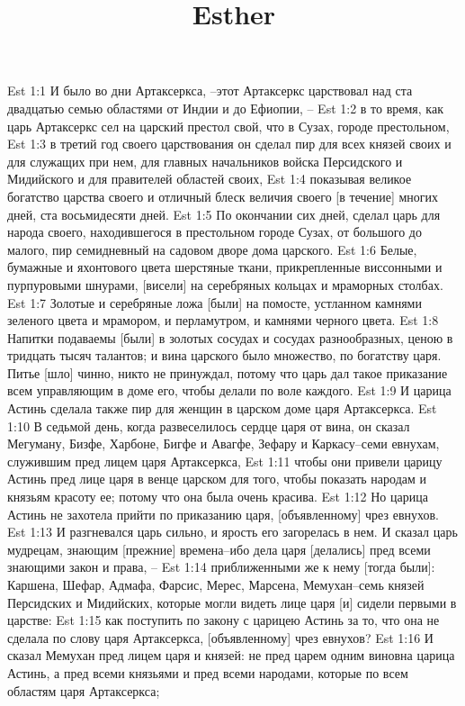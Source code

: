 

\title{Esther}

Est 1:1  И было во дни Артаксеркса, --этот Артаксеркс царствовал над ста двадцатью семью областями от Индии и до Ефиопии, --
Est 1:2  в то время, как царь Артаксеркс сел на царский престол свой, что в Сузах, городе престольном,
Est 1:3  в третий год своего царствования он сделал пир для всех князей своих и для служащих при нем, для главных начальников войска Персидского и Мидийского и для правителей областей своих,
Est 1:4  показывая великое богатство царства своего и отличный блеск величия своего [в течение] многих дней, ста восьмидесяти дней.
Est 1:5  По окончании сих дней, сделал царь для народа своего, находившегося в престольном городе Сузах, от большого до малого, пир семидневный на садовом дворе дома царского.
Est 1:6  Белые, бумажные и яхонтового цвета шерстяные ткани, прикрепленные виссонными и пурпуровыми шнурами, [висели] на серебряных кольцах и мраморных столбах.
Est 1:7  Золотые и серебряные ложа [были] на помосте, устланном камнями зеленого цвета и мрамором, и перламутром, и камнями черного цвета.
Est 1:8  Напитки подаваемы [были] в золотых сосудах и сосудах разнообразных, ценою в тридцать тысяч талантов; и вина царского было множество, по богатству царя. Питье [шло] чинно, никто не принуждал, потому что царь дал такое приказание всем управляющим в доме его, чтобы делали по воле каждого.
Est 1:9  И царица Астинь сделала также пир для женщин в царском доме царя Артаксеркса.
Est 1:10  В седьмой день, когда развеселилось сердце царя от вина, он сказал Мегуману, Бизфе, Харбоне, Бигфе и Авагфе, Зефару и Каркасу--семи евнухам, служившим пред лицем царя Артаксеркса,
Est 1:11  чтобы они привели царицу Астинь пред лице царя в венце царском для того, чтобы показать народам и князьям красоту ее; потому что она была очень красива.
Est 1:12  Но царица Астинь не захотела прийти по приказанию царя, [объявленному] чрез евнухов.
Est 1:13  И разгневался царь сильно, и ярость его загорелась в нем. И сказал царь мудрецам, знающим [прежние] времена--ибо дела царя [делались] пред всеми знающими закон и права, --
Est 1:14  приближенными же к нему [тогда были]: Каршена, Шефар, Адмафа, Фарсис, Мерес, Марсена, Мемухан--семь князей Персидских и Мидийских, которые могли видеть лице царя [и] сидели первыми в царстве:
Est 1:15  как поступить по закону с царицею Астинь за то, что она не сделала по слову царя Артаксеркса, [объявленному] чрез евнухов?
Est 1:16  И сказал Мемухан пред лицем царя и князей: не пред царем одним виновна царица Астинь, а пред всеми князьями и пред всеми народами, которые по всем областям царя Артаксеркса;
